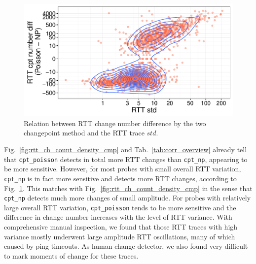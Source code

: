 \begin{figure}[!htb]
\centering
\includegraphics[width=.64\textwidth]{gfx/chap4/cpt_diff_vs_std.pdf}
\caption{Relation between RTT change number difference by the two changepoint method and the RTT trace $std$.}
\label{fig:cpt_diff_vs_std}
\end{figure}

Fig.~\ref{fig:rtt_ch_count_density_cmp} and Tab.~\ref{tab:corr_overview} already tell that \texttt{cpt\_poisson} detects in total more RTT changes than \texttt{cpt\_np}, appearing to be more sensitive.
However, for most probes with small overall RTT variation, \texttt{cpt\_np} is in fact more sensitive and detects more RTT changes, according to Fig.~\ref{fig:cpt_diff_vs_std}.
This matches with Fig.~\ref{fig:rtt_ch_count_density_cmp} in the sense that \texttt{cpt\_np} detects much more changes of small amplitude.
For probes with relatively large overall RTT variation, \texttt{cpt\_poisson} tends to be more sensitive and the difference in change number increases with the level of RTT variance.
With comprehensive manual inspection, we found that those RTT traces with high variance mostly underwent large amplitude RTT oscillations, many of which caused by ping timeouts. As human change detector, we also found very difficult to mark moments of change for these traces.

